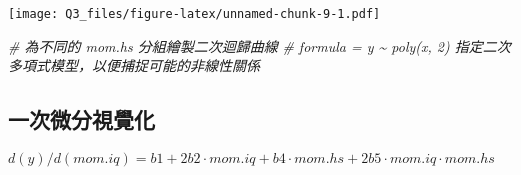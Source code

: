 \documentclass[
]{article}
\newenvironment{Shaded}{\begin{snugshade}}{\end{snugshade}}
\newcommand{\CommentTok}[1]{\textcolor[rgb]{0.56,0.35,0.01}{\textit{#1}}}
\begin{document}
\texttt{[image: Q3\_files/figure-latex/unnamed-chunk-9-1.pdf]}

\begin{Shaded}
\begin{Highlighting}[]
\CommentTok{\# 為不同的 mom.hs 分組繪製二次迴歸曲線}
\CommentTok{\# formula = y \textasciitilde{} poly(x, 2) 指定二次多項式模型，以便捕捉可能的非線性關係}
\end{Highlighting}
\end{Shaded}

\subsection{一次微分視覺化}\label{ux4e00ux6b21ux5faeux5206ux8996ux89baux5316-1}

\(d(y)/d(mom.iq)​=b1​+2b2​⋅mom.iq+b4​⋅mom.hs+2b5​⋅mom.iq⋅mom.hs\)
\end{document}
